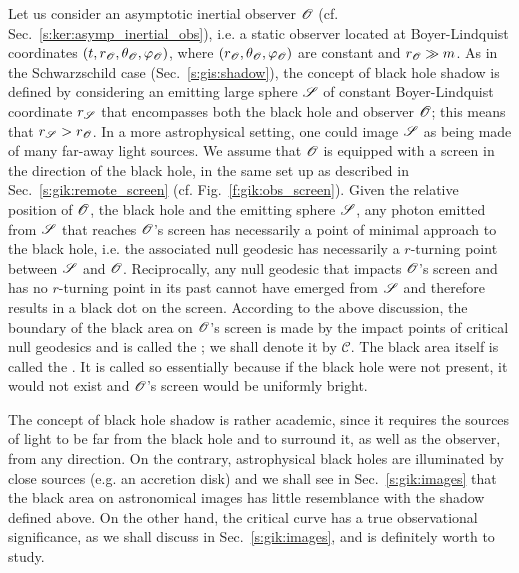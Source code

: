 Let us consider an asymptotic inertial observer $\mathscr{O}$ (cf. Sec.~\ref{s:ker:asymp_inertial_obs}),
i.e. a static observer located at Boyer-Lindquist coordinates $(t,r_{\mathscr{O}},\theta_{\mathscr{O}},\varphi_{\mathscr{O}})$,
where $(r_{\mathscr{O}},\theta_{\mathscr{O}},\varphi_{\mathscr{O}})$ are constant and $r_{\mathscr{O}} \gg m$.
As in the Schwarzschild case (Sec.~\ref{s:gis:shadow}), the concept of
black hole shadow is defined by considering an emitting large sphere $\mathscr{S}$
of constant Boyer-Lindquist coordinate $r_{\mathscr{S}}$ that
encompasses both the black hole and observer $\mathscr{O}$; this means that
$r_{\mathscr{S}} > r_{\mathscr{O}}$. In a more astrophysical setting, one could image $\mathscr{S}$
as being made of many far-away light sources.
We assume that $\mathscr{O}$ is equipped with a screen in the
direction of the black hole, in the same set up as described in Sec.~\ref{s:gik:remote_screen}
(cf. Fig.~\ref{f:gik:obs_screen}). Given the relative position of $\mathscr{O}$, the black hole
and the emitting sphere $\mathscr{S}$, any photon emitted from $\mathscr{S}$ that reaches $\mathscr{O}$'s screen
has necessarily a point of minimal approach to the black hole, i.e. the associated
null geodesic has necessarily a $r$-turning point between $\mathscr{S}$ and $\mathscr{O}$.
Reciprocally, any null geodesic that impacts $\mathscr{O}$'s screen and has no
$r$-turning point in its past cannot have emerged from $\mathscr{S}$ and therefore
results in a black dot on the screen. According to the above discussion, the
boundary of the black area on $\mathscr{O}$'s screen is made by the impact points of
critical null geodesics and is called the 
\cite{GrallHW19,GrallL20a}; we shall denote it by $\mathscr{C}$.
The black area itself is called the
.
It is called so essentially because if the black hole were not present, it would
not exist and $\mathscr{O}$'s screen would be uniformly bright.

\begin{remark}
The concept of black hole shadow is rather academic, since it
requires the sources of light to be far from the black hole and to surround it, as well
as the observer, from any direction. On the contrary, astrophysical black holes
are illuminated by close sources (e.g. an accretion disk) and we shall see in Sec.~\ref{s:gik:images}
that the black area on astronomical images has little resemblance with the shadow defined above.
On the other hand, the critical curve has a true observational significance, as we shall discuss
in Sec.~\ref{s:gik:images}, and is definitely worth to study.
\end{remark}

